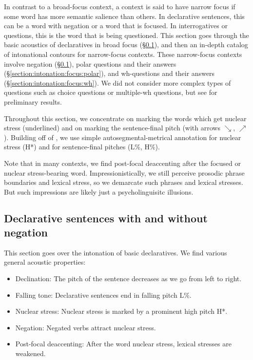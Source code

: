 In contrast to a broad-focus context, a context is said to have narrow focus if some word has more semantic salience than others. In declarative sentences, this can be a word with negation or a word that is focused. In interrogatives or questions, this is the word that is being questioned. This section goes through the basic acoustics of declaratives in broad focus (\S\ref{section:intonation:focus:declarative}), and then an in-depth catalog of intonational contours for  narrow-focus contexts. These narrow-focus contexts involve negation (\S\ref{section:intonation:focus:declarative}), polar questions and their answers (\S\ref{section:intonation:focus:polar}), and  wh-questions and their answers (\S\ref{section:intonation:focus:wh}). We did not consider more complex types of questions such as choice questions or multiple-wh questions, but see \citet{ToparlakDolatian-202x-IntonationFocusMarkingWesternArmenian} for preliminary results.  

Throughout this section, we concentrate on marking the words which get nuclear stress (underlined) and on marking the sentence-final pitch (with arrows $\searrow$, $\nearrow$).   Building off of \citet{ToparlakDolatian-202x-IntonationFocusMarkingWesternArmenian}, we use simple autosegmental-metrical annotation for nuclear stress (H*) and for sentence-final pitches (L\%, H\%). 

Note that in many contexts, we find post-focal deaccenting after the focused or nuclear stress-bearing word. Impressionistically, we still perceive prosodic phrase boundaries and lexical stress, so we demarcate such phrases and lexical stresses.  But such impressions are likely just a psycholinguisitc illusions. 

\subsection{Declarative sentences with and without negation} \label{section:intonation:focus:declarative}

This section goes over the intonation of  basic declaratives. We find various general acoustic properties: 
\begin{itemize}[noitemsep,topsep=0pt]
	\item Declination: The pitch of the sentence decreases as we go from left to right. 
	\item Falling tone: Declarative sentences end in falling pitch L\%. 
	\item Nuclear stress: Nuclear stress is marked by a prominent high pitch H*. 
	\item Negation: Negated verbs attract nuclear stress.
	\item Post-focal deaccenting: After the word nuclear stress,  lexical stresses are weakened. 
\end{itemize}

